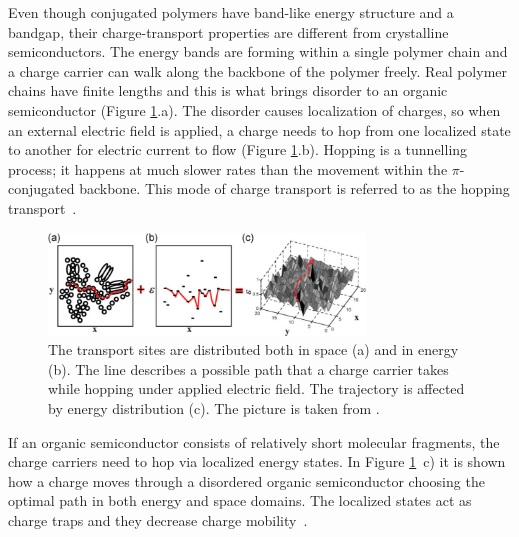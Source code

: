 \par Even though conjugated polymers have band-like energy structure and a bandgap, their charge-transport properties are different from crystalline semiconductors. The energy bands are forming within a single polymer chain and a charge carrier can walk along the backbone of the polymer freely. Real polymer chains have finite lengths and this is what brings disorder to an organic semiconductor (Figure \ref{fig:hopping}.a). The disorder causes localization of charges, so when an external electric field is applied, a charge needs to hop from one localized state to another for electric current to flow (Figure \ref{fig:hopping}.b). Hopping is a tunnelling process; it happens at much slower rates than the movement within the $\pi$-conjugated backbone. This mode of charge transport is referred to as the hopping transport~\cite{Tessler2009}.\\
\begin{figure} [h]
\centering
\includegraphics[width = 0.75\textwidth]{./electrochemistry/figures/hopping.png}
\caption{The transport sites are distributed both in space (a) and in energy (b). The line describes a possible path that a charge carrier takes while hopping under applied electric field. The trajectory is affected by energy distribution (c). The picture is taken from \cite{Tessler2009}.}
\label{fig:hopping}
\end{figure}

If an organic semiconductor consists of relatively short molecular fragments, the charge carriers need to hop via localized energy states. In Figure \ref{fig:hopping}~c) it is shown how a charge moves through a disordered organic semiconductor choosing the optimal path in both energy and space domains. The localized states act as charge traps and they decrease charge mobility~\cite{Yi2016}.\\




